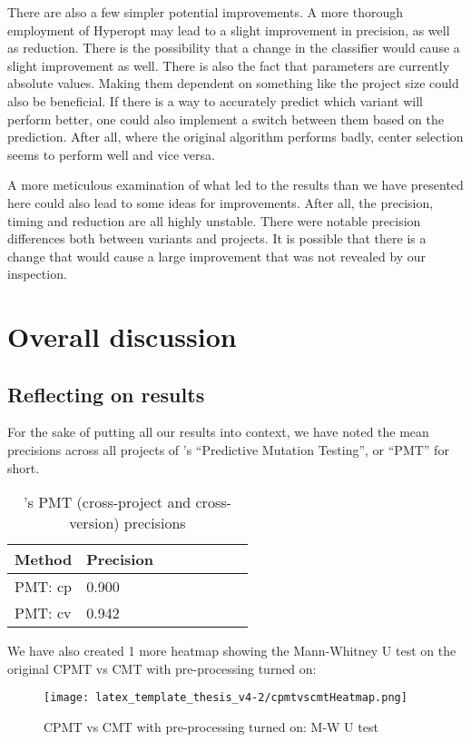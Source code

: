 \documentclass[twoside]{uva-inf-bachelor-thesis}
\begin{document}
There are also a few simpler potential improvements. A more thorough employment of Hyperopt may lead to a slight improvement in precision, as well as reduction. There is the possibility that a change in the classifier would cause a slight improvement as well. There is also the fact that parameters are currently absolute values. Making them dependent on something like the project size could also be beneficial. If there is a way to accurately predict which variant will perform better, one could also implement a switch between them based on the prediction. After all, where the original algorithm performs badly, center selection seems to perform well and vice versa.

A more meticulous examination of what led to the results than we have presented here could also lead to some ideas for improvements. After all, the precision, timing and reduction are all highly unstable. There were notable precision differences both between variants and projects. It is possible that there is a change that would cause a large improvement that was not revealed by our inspection. 

\chapter{Overall discussion}
\label{chap:6}
\section{Reflecting on results}
For the sake of putting all our results into context, we have noted the mean precisions across all projects of \textcite{Zhang16}'s ``Predictive Mutation Testing'', or ``PMT'' for short.
\begin{table}[h]
    \centering
    \begin{tabular}{|l|l|l|l|l|l|l|l|}
    \hline
      Method & Precision\\ \hline
      PMT: cp & 0.900\\ \hline
      PMT: cv & 0.942\\ \hline
    \end{tabular}
    \caption{\textcite{Zhang16}'s PMT (cross-project and cross-version) precisions}
\end{table}

We have also created 1 more heatmap showing the Mann-Whitney U test on the original CPMT vs CMT with pre-processing turned on:

\begin{figure}[h!]
    \centering
    \texttt{[image: latex\_template\_thesis\_v4-2/cpmtvscmtHeatmap.png]}
    \caption{CPMT vs CMT with pre-processing turned on: M-W U test}
    \label{fig:cpmtHeatmap}
\end{figure}
\end{document}
